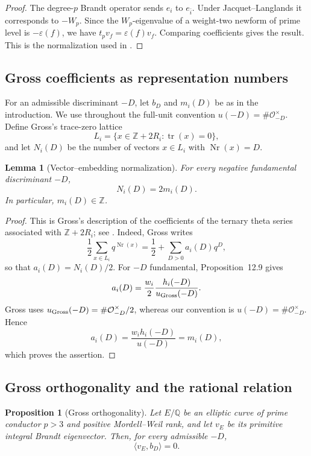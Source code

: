 \documentclass[11pt]{amsart}
\newtheorem{proposition}[theorem]{Proposition}
\newtheorem{lemma}[theorem]{Lemma}
\theoremstyle{definition}
\theoremstyle{remark}
\newcommand{\Q}{\mathbb{Q}}
\newcommand{\Z}{\mathbb{Z}}
\newcommand{\OO}{\mathcal{O}}
\newcommand{\tr}{\operatorname{tr}}
\newcommand{\Nr}{\operatorname{Nr}}
\begin{document}
\begin{proof}
The degree-$p$ Brandt operator sends $e_i$ to $e_{\bar i}$.  Under Jacquet--Langlands it corresponds to $-W_p$.  Since the $W_p$-eigenvalue of a weight-two newform of prime level is $-\varepsilon(f)$, we have $t_pv_f=\varepsilon(f)v_f$.  Comparing coefficients gives the result.  This is the normalization used in \cite[Propositions~18--19]{KazalickiKohen2017}.
\end{proof}

\subsection{Gross coefficients as representation numbers}

For an admissible discriminant $-D$, let $b_D$ and $m_i(D)$ be as in the introduction.  We use throughout the full-unit convention $u(-D)=\#\OO_{-D}^{\times}$.  Define Gross's trace-zero lattice
\[
  L_i=\{x\in\Z+2R_i:\tr(x)=0\},
\]
and let $N_i(D)$ be the number of vectors $x\in L_i$ with $\Nr(x)=D$.

\begin{lemma}[Vector--embedding normalization]\label{lem:normalization}
For every negative fundamental discriminant $-D$,
\[
  N_i(D)=2m_i(D).
\]
In particular, $m_i(D)\in\Z$.
\end{lemma}

\begin{proof}
This is Gross's description of the coefficients of the ternary theta
series associated with $\Z+2R_i$; see
\cite[(12.7)--(12.8) and Proposition~12.9]{Gross1987}.
Indeed, Gross writes
\[
  \frac12\sum_{x\in L_i}q^{\Nr(x)}
  =\frac12+\sum_{D>0}a_i(D)q^D,
\]
so that $a_i(D)=N_i(D)/2$.  For $-D$ fundamental,
Proposition~12.9 gives
\[
  a_i(D)=\frac{w_i}{2}\frac{h_i(-D)}{u_{\rm Gross}(-D)}.
\]
Gross uses $u_{\rm Gross}(-D)=\#\OO_{-D}^{\times}/2$, whereas our
convention is $u(-D)=\#\OO_{-D}^{\times}$. Hence
\[
  a_i(D)=\frac{w_i h_i(-D)}{u(-D)}=m_i(D),
\]
which proves the assertion.
\end{proof}

\subsection{Gross orthogonality and the rational relation}

\begin{proposition}[Gross orthogonality]\label{prop:gross-orthogonality}
Let $E/\Q$ be an elliptic curve of prime conductor $p>3$ and positive Mordell--Weil rank, and let $v_E$ be its primitive integral Brandt eigenvector.  Then, for every admissible $-D$,
\[
  \langle v_E,b_D\rangle=0.
\]
\end{proposition}
\end{document}

